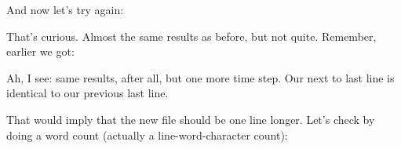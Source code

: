 
\abc

\carol
And now let's try again:

\cba



\abc

\bob
That's curious.  Almost the same results as before, but not quite.
Remember, earlier we got:

\cba



\abc

\bob
Ah, I see: same results, after all, but one more time step.
Our next to last line is identical to our previous last line.

\carol
That would imply that the new file should be one line longer.  Let's
check by doing a word count (actually a line-word-character count):

\cba


\abc

